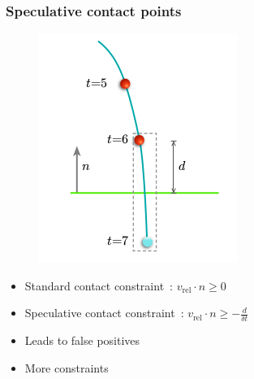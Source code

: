 \documentclass{beamer}
\begin{document}
\begin{frame}
  \frametitle{Speculative contact points}
  
  \begin{minipage}{0.4\linewidth}
    \begin{figure}[p]
      \centering
      \includegraphics[width=0.9\linewidth]{ccd5}
    \end{figure}
  \end{minipage}
  \hfill
  \begin{minipage}{0.55\linewidth}
    \begin{itemize}
    \item Standard contact constraint~: $v_\text{rel} \cdot n \geq 0$
    \item Speculative contact constraint~: $v_\text{rel} \cdot n \geq -\frac{d}{\delta t}$
    \end{itemize}
  \end{minipage}

  \pause
  \begin{itemize}
  \item Leads to false positives
  \item More constraints
  \end{itemize}
  
\end{frame}
\end{document}
